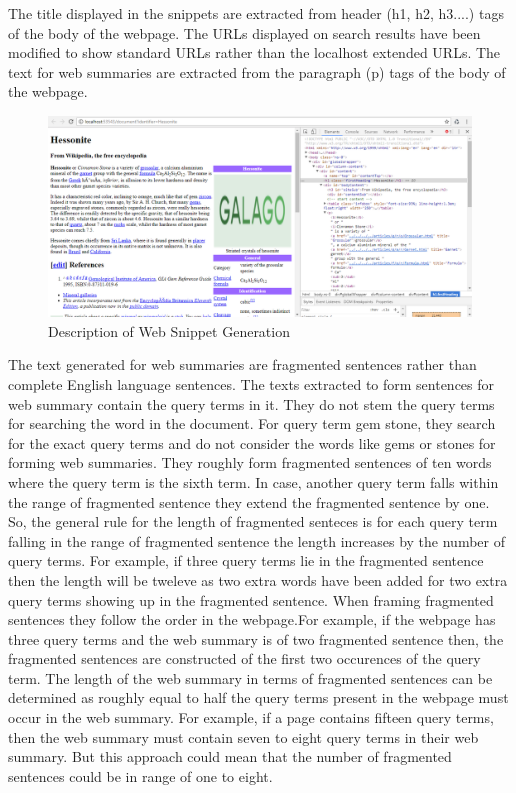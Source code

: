 \documentclass[12pt]{report}
\begin{document}
The title displayed in the snippets are extracted from header (h1, h2, h3....)  tags of the body of the webpage. The URLs displayed on search results have been modified to show standard URLs rather than the localhost extended URLs. The text for web summaries are extracted from the paragraph (p) tags of the body of the webpage. 
\begin{figure}[ht]
  \centering
  \includegraphics[width=1\textwidth]{Problem6_5/DescriptionofWebSnippets.PNG}
  \caption{Description of Web Snippet Generation}
  \label{fig:2}
\end{figure}

The text generated for web summaries are fragmented sentences rather than complete English language sentences. The texts extracted to form sentences for web summary contain the query terms in it. They do not stem the query terms for searching the word in the document. For query term gem stone, they search for the exact query terms and do not consider the words like gems or stones for forming web summaries. They roughly form fragmented sentences of ten words where the query term is the sixth term. In case, another query term falls within the range of fragmented sentence they extend the fragmented sentence by one. So, the general rule for the length of fragmented senteces is for each query term falling in the range of fragmented sentence the length increases by the number of query terms. For example, if three query terms lie in the fragmented sentence then the length will be tweleve as two extra words have been added for two extra query terms showing up in the fragmented sentence. When framing fragmented sentences they follow the order in the webpage.For example, if the webpage has three query terms and the web summary is of two fragmented sentence then, the fragmented sentences are constructed of the first two occurences of the query term. The length of the web summary in terms of fragmented sentences can be determined as roughly equal to half the query terms present in the webpage must occur in the web summary. For example, if a page contains fifteen query terms, then the web summary must contain seven to eight query terms in their web summary. But this approach could mean that the number of fragmented sentences could be in range of one to eight. 
\end{document}
